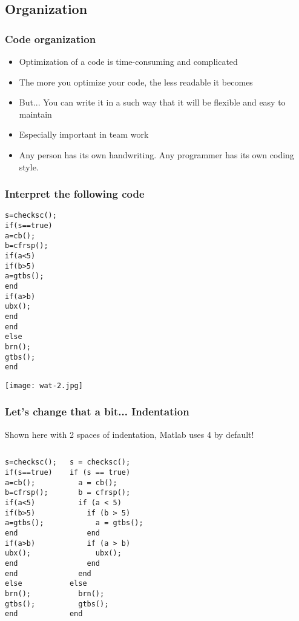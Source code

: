 \subsection*{Organization}
\begin{frame}
\frametitle{Code organization}
  \begin{itemize}
    \item Optimization of a code is time-consuming and complicated
    \item The more you optimize your code, the less readable it becomes
    \item But... You can write it in a such way that it will be flexible and easy to maintain
    \item Especially important in team work
    \item Any person has its own handwriting. Any programmer has its own coding style.
\end{itemize}

\end{frame}

\begin{frame}[fragile]
 \frametitle{Interpret the following code}
 \begin{lstlisting}
s=checksc();
if(s==true)
a=cb();
b=cfrsp();
if(a<5)
if(b>5)
a=gtbs();
end
if(a>b)
ubx();
end
end
else
brn();
gtbs();
end
 \end{lstlisting}
\end{frame}

\begin{frame}[plain]
\texttt{[image: wat-2.jpg]}
\end{frame}

\begin{frame}[fragile]
 \frametitle{Let's change that a bit... Indentation}
 \pause
 Shown here with 2 spaces of indentation, Matlab uses 4 by default!
 \begin{columns}[T]
     \begin{lstlisting}
s=checksc();
if(s==true)
a=cb();
b=cfrsp();
if(a<5)
if(b>5)
a=gtbs();
end
if(a>b)
ubx();
end
end
else
brn();
gtbs();
end
 \end{lstlisting}
     \begin{lstlisting}
s = checksc();
if (s == true)
  a = cb();
  b = cfrsp();
  if (a < 5)
    if (b > 5)
      a = gtbs();
    end
    if (a > b)
      ubx();
    end
  end
else
  brn();
  gtbs();
end
 \end{lstlisting}
 \end{columns}
\end{frame}

